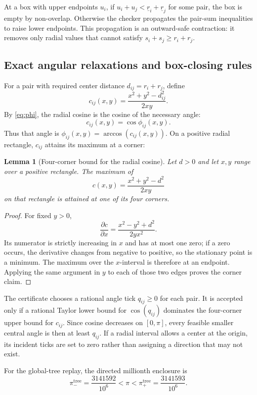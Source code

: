 \documentclass[11pt,a4paper]{article}
\newtheorem{lemma}[theorem]{Lemma}
\theoremstyle{remark}
\begin{document}
At a box with upper endpoints $u_i$, if
$u_i+u_j<\underline r_i+\underline r_j$ for some pair, the box is empty by
non-overlap.  Otherwise the checker propagates the pair-sum inequalities to
raise lower endpoints.  This propagation is an outward-safe contraction:
it removes only radial values that cannot satisfy
$s_i+s_j\ge r_i+r_j$.

\subsection{Exact angular relaxations and box-closing rules}
\label{sec:box-rules}

For a pair with required center distance $d_{ij}=r_i+r_j$, define
\[
  c_{ij}(x,y)=\frac{x^2+y^2-d_{ij}^2}{2xy}.
\]
By \eqref{eq:phi}, the radial cosine is the cosine of the necessary angle:
\[
  c_{ij}(x,y)=\cos\phi_{ij}(x,y).
\]
Thus that angle is $\phi_{ij}(x,y)=\arccos(c_{ij}(x,y))$.  On a positive
radial rectangle, $c_{ij}$ attains its maximum at a corner:

\begin{lemma}[Four-corner bound for the radial cosine]
\label{lem:corner-bound}
Let $d>0$ and let $x,y$ range over a positive rectangle.  The maximum of
\[
  c(x,y)=\frac{x^2+y^2-d^2}{2xy}
\]
on that rectangle is attained at one of its four corners.
\end{lemma}

\begin{proof}
For fixed $y>0$,
\[
  \frac{\partial c}{\partial x}
   =\frac{x^2-y^2+d^2}{2yx^2}.
\]
Its numerator is strictly increasing in $x$ and has at most one zero; if a
zero occurs, the derivative changes from negative to positive, so the
stationary point is a minimum.  The maximum over the $x$-interval is
therefore at an endpoint.  Applying the same argument in $y$ to each of
those two edges proves the corner claim.
\end{proof}

The certificate chooses a rational angle tick $q_{ij}\ge0$ for each pair.
It is accepted only if a rational Taylor lower bound for $\cos(q_{ij})$
dominates the four-corner upper bound for $c_{ij}$.  Since cosine decreases
on $[0,\pi]$, every feasible smaller central angle is then at least
$q_{ij}$.  If a radial interval allows a center at the origin, its incident
ticks are set to zero rather than assigning a direction that may not exist.

For the global-tree replay, the directed millionth enclosure is
\[
  \pi_-^{\mathrm{tree}}=\frac{3141592}{10^6}
  <\pi<
  \pi_+^{\mathrm{tree}}=\frac{3141593}{10^6}.
\]
\end{document}
